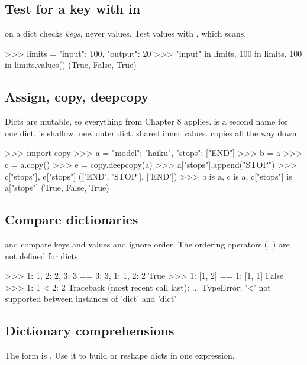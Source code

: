 \subsection{Test for a key with in}

 on a dict checks \emph{keys}, never values. Test values with , which scans.

\begin{pycode}
>>> limits = {"input": 100, "output": 20}
>>> "input" in limits, 100 in limits, 100 in limits.values()
(True, False, True)
\end{pycode}

\subsection{Assign, copy, deepcopy}

Dicts are mutable, so everything from Chapter 8 applies.  is a second name for one dict.
 is shallow: new outer dict, shared inner values.  copies all the way
down.

\begin{pycode}
>>> import copy
>>> a = {"model": "haiku", "stops": ["END"]}
>>> b = a
>>> c = a.copy()
>>> e = copy.deepcopy(a)
>>> a["stops"].append("STOP")
>>> c["stops"], e["stops"]
(['END', 'STOP'], ['END'])
>>> b is a, c is a, c["stops"] is a["stops"]
(True, False, True)
\end{pycode}

\subsection{Compare dictionaries}

\code{==} and \code{!=} compare keys and values and ignore order. The ordering operators
(\code{<}, \code{>}) are not defined for dicts.

\begin{pycode}
>>> {1: 1, 2: 2, 3: 3} == {3: 3, 1: 1, 2: 2}
True
>>> {1: [1, 2]} == {1: [1, 1]}
False
>>> {1: 1} < {2: 2}
Traceback (most recent call last):
  ...
TypeError: '<' not supported between instances of 'dict' and 'dict'
\end{pycode}

\subsection{Dictionary comprehensions}

The form is . Use it to build or reshape
dicts in one expression.

